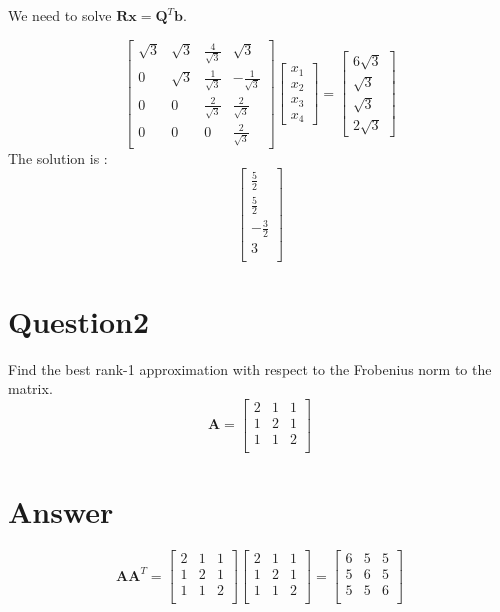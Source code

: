 \documentclass{article}
\begin{document}
We need to solve \(\bm{R}\bm{x} = \bm{Q}^T\bm{b}\).

\[
    \begin{bmatrix}
       \sqrt{3} & \sqrt{3} & \frac{4}{\sqrt{3}} & \sqrt{3}  \\
       0 & \sqrt{3} & \frac{1}{\sqrt{3}} & -\frac{1}{\sqrt{3}}  \\
       0 & 0 & \frac{2}{\sqrt{3}} & \frac{2}{\sqrt{3}}  \\
       0 & 0 & 0 & \frac{2}{\sqrt{3}}  
    \end{bmatrix} \begin{bmatrix}
        x_1 \\
        x_2 \\
        x_3 \\
        x_4
    \end{bmatrix} = \begin{bmatrix}
        6\sqrt{3} \\
        \sqrt{3} \\
        \sqrt{3} \\
        2\sqrt{3}
    \end{bmatrix}
\]
The solution is :
\[
\begin{bmatrix}
    \frac 5 2 \\
    \frac 5 2 \\
    -\frac 3 2 \\
    3 \\
\end{bmatrix}
\]




\section*{Question2}
Find the best rank-1 approximation with respect to the Frobenius norm to the matrix.
\[\bm{A} = \begin{bmatrix}
   2 & 1 & 1 \\ 
   1 & 2 & 1 \\ 
   1 & 1 & 2 \\ 
\end{bmatrix}\]

\section*{Answer}
\[
\bm{A}\bm{A}^T = \begin{bmatrix}
    2 & 1 & 1 \\
    1 & 2 & 1 \\
    1 & 1 & 2 \\
\end{bmatrix} \begin{bmatrix}
    2 & 1 & 1 \\
    1 & 2 & 1 \\
    1 & 1 & 2 \\
\end{bmatrix} = \begin{bmatrix}
    6 & 5 & 5 \\
    5 & 6 & 5 \\
    5 & 5 & 6 \\
\end{bmatrix}
\]
\end{document}
